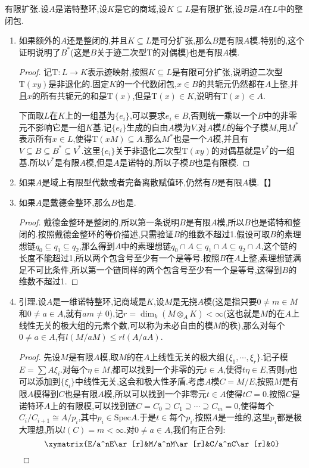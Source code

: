 有限扩张.设$A$是诺特整环,设$K$是它的商域,设$K\subseteq L$是有限扩张,设$B$是$A$在$L$中的整闭包.
\begin{enumerate}
	\item 如果额外的$A$还是整闭的,并且$K\subseteq L$是可分扩张,那么$B$是有限$A$模.特别的,这个证明说明了$B^*$(这是$B$关于迹二次型$\mathrm{T}$的对偶模)也是有限$A$模.
	\begin{proof}
		
		记$\mathrm{T}:L\to K$表示迹映射,按照$K\subseteq L$是有限可分扩张,说明迹二次型$\mathrm{T}(xy)$是非退化的.固定$K$的一个代数闭包,$x\in B$的共轭元仍然都在$A$上整,并且$x$的所有共轭元的和是$\mathrm{T}(x)$,但是$\mathrm{T}(x)\in K$,说明有$\mathrm{T}(x)\in A$.
		
		下面取$L$在$K$上的一组基为$\{e_i\}$,可以要求$e_i\in B$,否则统一乘以一个$B$中的非零元不影响它是一组$K$基.记$\{e_i\}$生成的自由$A$模为$V$.对$A$模$L$的每个子模$M$,用$M^*$表示所有$x\in L$,使得$\mathrm{T}(xM)\subseteq A$.那么$M^*$也是一个$A$模,并且有$V\subseteq B\subseteq B^*\subseteq V^*$.这里$\{e_i\}$关于非退化二次型$\mathrm{T}(xy)$的对偶基就是$V^*$的一组基.所以$V^*$是有限$A$模,但是$A$是诺特的,所以子模$B$也是有限模.
	\end{proof}
	\item 如果$A$是域上有限型代数或者完备离散赋值环,仍然有$B$是有限$A$模.【】
	\item 如果$A$是戴德金整环,那么$B$也是.
	\begin{proof}
		
		戴德金整环是整闭的,所以第一条说明$B$是有限$A$模,所以$B$也是诺特和整闭的.按照戴德金整环的等价描述,只需验证$B$的维数不超过1.假设可取$B$的素理想链$q_0\subseteq q_1\subseteq q_2$,那么得到$A$中的素理想链$q_0\cap A\subseteq q_1\cap A\subseteq q_2\cap A$,这个链的长度不能超过1,所以两个包含号至少有一个是等号.按照$B$在$A$上整,素理想链满足不可比条件,所以第一个链同样的两个包含号至少有一个是等号,这得到$B$的维数不超过1.
	\end{proof}
	\item 引理.设$A$是一维诺特整环,记商域是$K$,设$M$是无挠$A$模(这是指只要$0\not=m\in M$和$0\not=a\in A$,就有$am\not=0$),记$r=\dim_k(M\otimes_AK)<\infty$(这也就是$M$的在$A$上线性无关的极大组的元素个数,可以称为未必自由的模$M$的秩),那么对每个$0\not=a\in A$,有$l(M/aM)\le rl(A/aA)$.
	\begin{proof}
		
		先设$M$是有限$A$模,取$M$的在$A$上线性无关的极大组$\{\xi_1,\cdots,\xi_r\}$.记子模$E=\sum A\xi_i$.对每个$\eta\in M$,都可以找到一个非零的元$t\in A$,使得$t\eta\in E$,否则$\eta$也可以添加到$\{\xi_i\}$中线性无关,这会和极大性矛盾.考虑$A$模$C=M/E$,按照$M$是有限$A$模得到$C$也是有限$A$模,所以可以找到一个非零元$t\in A$使得$tC=0$.按照$C$是诺特环$A$上的有限模,可以找到链$C=C_0\supseteq C_1\supseteq\cdots\supseteq C_m=0$,使得每个$C_i/C_{i+1}\cong A/p_i$,其中$p_i\in\mathrm{Spec}A$.于是$t\in$每个$p_i$.按照$A$是一维的,这里$p_i$都是极大理想,所以$l(C)=m<\infty$.对$0\not=a\in A$,我们有正合列:
		$$\xymatrix{E/a^nE\ar[r]&M/a^nM\ar[r]&C/a^nC\ar[r]&0}$$
		

\end{proof}
\end{enumerate}
